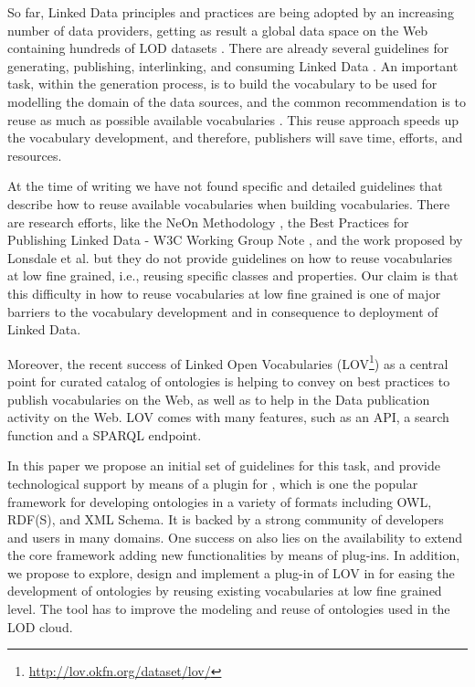 So far, Linked Data principles and practices are being adopted by an increasing number of data providers, getting as result a global data space on the Web containing hundreds of LOD datasets \cite{Heath_Bizer_2011}. There are already several guidelines for generating, publishing, interlinking, and consuming Linked Data \cite{Heath_Bizer_2011}. An important task, within the generation process, is to build the vocabulary to be used for modelling the domain of the data sources, and the common recommendation is to reuse as much as possible available vocabularies \cite{Heath_Bizer_2011,hyland14}. This reuse approach speeds up the vocabulary development, and therefore, publishers will save time, efforts, and resources. 

At the time of writing we have not found specific and detailed guidelines that describe how to reuse available vocabularies when building vocabularies. There are research efforts, like the NeOn Methodology \cite{suarezfigueroa2012ontology}, the Best Practices for Publishing Linked Data - W3C Working Group Note \cite{hyland14}, and the work proposed by Lonsdale et al. \cite{Lonsdale2010318} but they do not provide guidelines on how to reuse vocabularies at low fine grained, i.e., reusing specific classes and properties. Our claim is that this difficulty in how to reuse vocabularies at low fine grained is one of major barriers to the vocabulary development and in consequence to deployment of Linked Data.

Moreover, the recent success of Linked Open Vocabularies (LOV\footnote{\url{http://lov.okfn.org/dataset/lov/}}) as a central point for curated catalog of ontologies is helping to convey on best practices to publish vocabularies on the Web, as well as to help in the Data publication activity on the Web. LOV comes with many features, such as an API, a search function and a SPARQL endpoint.

In this paper we propose an initial set of guidelines for this task, and provide technological support by means of a plugin for \protege, which is one the popular framework for developing ontologies in a variety of formats including OWL, RDF(S), and XML Schema. It is backed by a strong community of developers and users in many domains. One success on \protege also lies on the availability to extend the core framework adding new functionalities by means of plug-ins. In addition, we propose to explore, design and implement a plug-in of LOV in \protege for easing the development of ontologies by reusing existing vocabularies at low fine grained level. The tool has to improve the modeling and reuse of ontologies used in the LOD cloud.

